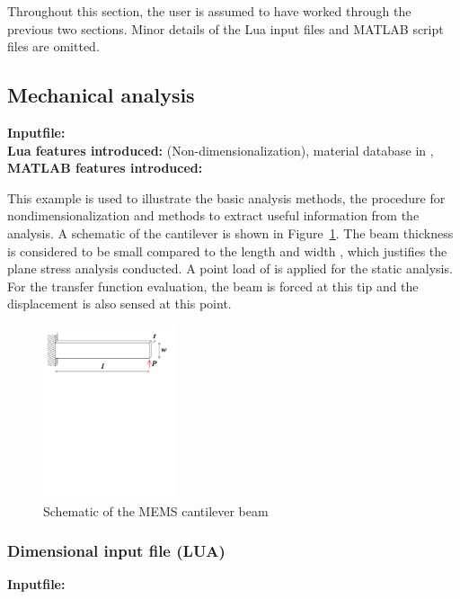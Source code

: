 Throughout this section, the user is assumed to have worked through 
the previous two sections. Minor details of the Lua input files and 
MATLAB script files are omitted. 

\clearpage
\subsection{Mechanical analysis}
\begin{flushleft}
  \textbf{Inputfile:}
  \\
  \textbf{Lua features introduced:}
  (Non-dimensionalization), 
  material database in ,
  \\
  \textbf{MATLAB features introduced:}
\end{flushleft}
This example is used to illustrate the basic analysis methods,
the procedure for nondimensionalization and methods to extract
useful information from the analysis. A schematic of the cantilever
is shown in Figure~\ref{fig:MEMSCantileverBeam_Mech}. The beam thickness
 is considered to be small compared to the length  and
width , which justifies the plane stress analysis conducted.
A point load of  is applied for the static analysis. For the
transfer function evaluation, the beam is forced at this tip and the
displacement is also sensed at this point.

\begin{figure}[htbp]
\centering
\includegraphics[trim = 0in 7in 0.5in 0in, clip, height = 2in]{fig/memscantileverbeam_mech.pdf}
\caption{Schematic of the MEMS cantilever beam}
\label{fig:MEMSCantileverBeam_Mech}
\end{figure}

\clearpage
\subsubsection*{Dimensional input file (LUA)}
\begin{flushleft}
  \textbf{Inputfile:}
\end{flushleft}
\hspace{1in}
{\footnotesize
{}
}

